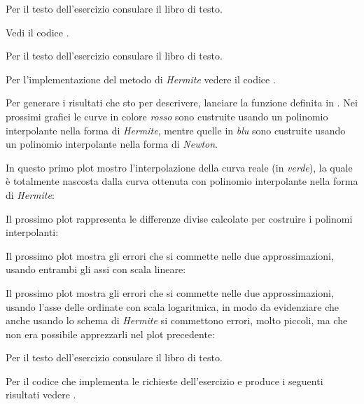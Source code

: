 \begin{exercise}[4.8]
Per il testo dell'esercizio consulare il libro di testo.
\end{exercise}
Vedi il codice . 

\begin{exercise}[4.9]
Per il testo dell'esercizio consulare il libro di testo.
\end{exercise}
Per l'implementazione del metodo di \emph{Hermite} vedere il codice
.

Per generare i risultati
che sto per descrivere, lanciare la funzione definita in
. 
Nei prossimi grafici le curve in colore \emph{rosso} sono custruite usando un
polinomio interpolante nella forma di \emph{Hermite}, mentre quelle in
\emph{blu} sono custruite usando un polinomio interpolante nella forma di
\emph{Newton}.

In questo primo plot mostro l'interpolazione della curva reale (in
\emph{verde}), la quale \`e totalmente nascosta dalla curva ottenuta con
polinomio interpolante nella forma di \emph{Hermite}:
\begin{center} 

\end{center}

Il prossimo plot rappresenta le differenze divise calcolate per costruire i
polinomi interpolanti:
\begin{center} 

\end{center}

Il prossimo plot mostra gli errori che si commette nelle due approssimazioni,
usando entrambi gli assi con scala lineare:
\begin{center} 

\end{center}

Il prossimo plot mostra gli errori che si commette nelle due approssimazioni,
usando l'asse delle ordinate con scala logaritmica, in modo da evidenziare che
anche usando lo schema di \emph{Hermite} si commettono errori, molto piccoli,
ma che non era possibile apprezzarli nel plot precedente:
\begin{center} 

\end{center}

\begin{exercise}[4.11]
\label{exercise:exercise411}
Per il testo dell'esercizio consulare il libro di testo.
\end{exercise}
Per il codice che implementa le richieste dell'esercizio e produce i seguenti
risultati vedere .

